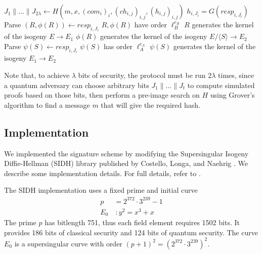 \documentclass[runningheads,a4paper]{llncs}
\begin{document}
\begin{algorithm}[ht]
\caption{$ver(pk,m, \sigma)$}
\begin{algorithmic}
\STATE $J_1 \| \dots \| J_{2\lambda} \leftarrow H(m,x, (com_i)_i, (ch_{i,j})_{i,j}, (h_{i,j})_{i,j})$ 
\vspace{2mm}
	 $h_{i,J_i} = G(resp_{i,J_i})$
		\STATE Parse $(R,\phi(R))\leftarrow resp_{i,J_i}$
		 $R,\phi(R)$ have order $\ell_B^{e_B}$
		 $R$ generates the kernel of the isogeny $E \to E_1$
		 $\phi(R)$ generates the kernel of the isogeny $E/\langle S \rangle \to E_2$
	\ELSE
		\STATE Parse $\psi(S) \leftarrow resp_{i,J_i}$
		 $\psi(S)$ has order $\ell_A^{e_A}$
		 $\psi(S)$ generates the kernel of the isogeny $E_1 \to E_2$ 
	\ENDIF
\ENDFOR
{}
\ENDIF
\end{algorithmic}
\end{algorithm}

Note that, to achieve $\lambda$ bits of security, the protocol must be run $2\lambda$ times, since a quantum adversary can choose arbitrary bits $J_1 \| \dots \| J_t$ to compute simulated proofs based on those bits, then perform a pre-image search on $H$ using Grover's algorithm \cite{Grover96} to find a message $m$ that will give the required hash.





\subsection{Implementation}
We implemented the signature scheme by modifying the Supersingular Isogeny Diffie-Hellman (SIDH) library published by Costello, Longa, and Naehrig \cite{Costello16}. We describe some implementation details. For full details, refer to \cite{FJP14,Costello16}.

The SIDH implementation uses a fixed prime and initial curve
\begin{align*}
p &= 2^{372}\cdot 3^{239}-1 \\
E_0\!\!&\ : y^2 = x^3+x
\end{align*}
The prime $p$ has bitlength 751, thus each field element requires 1502 bits. It provides 186 bits of classical security and 124 bits of quantum security. The curve $E_0$ is a supersingular curve with order $(p+1)^2 = (2^{372}\cdot 3^{239})^2$.
\end{document}
